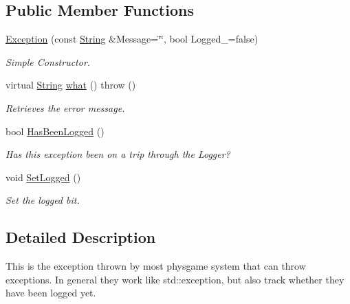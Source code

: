 \subsection*{Public Member Functions}
\begin{DoxyCompactItemize}
\item 
\hyperlink{classphys_1_1Exception_a274184178b7e7589bf1dcde1643924c1}{Exception} (const \hyperlink{namespacephys_aa03900411993de7fbfec4789bc1d392e}{String} \&Message=\char`\"{}\char`\"{}, bool Logged\_\-=false)
\begin{DoxyCompactList}\small\item\em Simple Constructor. \item\end{DoxyCompactList}\item 
virtual \hyperlink{namespacephys_aa03900411993de7fbfec4789bc1d392e}{String} \hyperlink{classphys_1_1Exception_ac929f9b3929526eec6e6b581c9a9dd73}{what} ()  throw ()
\begin{DoxyCompactList}\small\item\em Retrieves the error message. \item\end{DoxyCompactList}\item 
bool \hyperlink{classphys_1_1Exception_ab1399e25435c390db551855fda338951}{HasBeenLogged} ()
\begin{DoxyCompactList}\small\item\em Has this exception been on a trip through the Logger? \item\end{DoxyCompactList}\item 
\hypertarget{classphys_1_1Exception_a48ea61816b826d9b10dd43b76b6c7143}{
void \hyperlink{classphys_1_1Exception_a48ea61816b826d9b10dd43b76b6c7143}{SetLogged} ()}
\label{dc/d47/classphys_1_1Exception_a48ea61816b826d9b10dd43b76b6c7143}

\begin{DoxyCompactList}\small\item\em Set the logged bit. \item\end{DoxyCompactList}\end{DoxyCompactItemize}


\subsection{Detailed Description}
This is the exception thrown by most physgame system that can throw exceptions. In general they work like std::exception, but also track whether they have been logged yet. 

